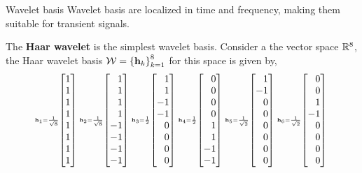 \documentclass[aspectratio=169]{beamer}
\def\mf{\ensuremath\mathbf}
\def\mb{\ensuremath\mathbb}
\def\mc{\ensuremath\mathcal}
\def\lc{\ensuremath\left\{}
\def\rc{\ensuremath\right\}}
\def\bmx{\ensuremath\begin{bmatrix*}[r]}
\def\emx{\ensuremath\end{bmatrix*}}
\begin{document}
\begin{frame}[t]{Wavelet basis}
  Wavelet basis are localized in time and frequency, making them suitable for transient signals.
  
  The \textbf{Haar wavelet} is the simplest wavelet basis. Consider a the vector space $\mb{R}^8$, the Haar wavelet basis $\mc{W} = \lc \mf{h}_k \rc_{k=1}^8$ for this space is given by,
  \[ \scriptscriptstyle \mf{h}_1 = \frac{1}{\sqrt{8}}\bmx 1 \\ 1 \\ 1 \\ 1 \\ 1 \\ 1 \\ 1 \\ 1 \emx \,\, 
  \mf{h}_2 = \frac{1}{\sqrt{8}}\bmx 1 \\ 1 \\ 1 \\ 1 \\ -1 \\ -1 \\ -1 \\ -1 \emx \,\, 
  \mf{h}_3 = \frac{1}{2}\bmx 1 \\ 1 \\ -1 \\ -1 \\ 0 \\ 0 \\ 0 \\ 0 \emx \,\, 
  \mf{h}_4 = \frac{1}{2}\bmx 0 \\ 0 \\ 0 \\ 0 \\ 1 \\ 1 \\ -1 \\ -1 \emx \,\, 
  \mf{h}_5 = \frac{1}{\sqrt{2}}\bmx 1 \\ -1 \\ 0 \\ 0 \\ 0 \\ 0 \\ 0 \\ 0 \emx \,\, 
  \mf{h}_6 = \frac{1}{\sqrt{2}}\bmx 0 \\ 0 \\ 1 \\ -1 \\ 0 \\ 0 \\ 0 \\ 0 \emx \,\, 
\]
\end{frame}
\end{document}
